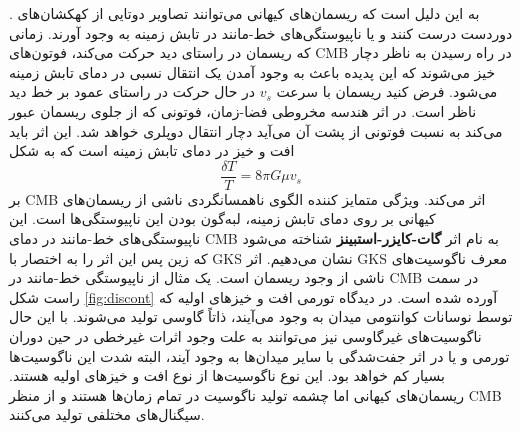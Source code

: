 . به این دلیل است که ریسمان‌های کیهانی می‌توانند تصاویر دوتایی از کهکشان‌های دوردست درست کنند و یا ناپیوستگی‌های خط-مانند در تابش زمینه به وجود آورند.
  \cite{ade2014planck}
   زمانی که ریسمان در راستای دید حرکت می‌کند، فوتون‌های CMB  در راه رسیدن به ناظر دچار خیز می‌شوند که این پدیده باعث به وجود آمدن یک انتقال نسبی در دمای تابش زمینه می‌شود. فرض کنید ریسمان با سرعت $v_s$ در حال حرکت در راستای عمود بر خط دید ناظر است. در اثر هندسه مخروطی فضا-زمان، فوتونی که از جلوی ریسمان عبور می‌کند به نسبت فوتونی از پشت آن می‌آید دچار انتقال دوپلری خواهد شد. این اثر باید افت و خیز در دمای تابش زمینه است که به شکل
    \begin{equation}
    \frac{\delta T}{T} = 8 \pi G \mu v_s 
    \end{equation}
    بر CMB اثر می‌کند.  ویژگی متمایز کننده‌ الگوی ناهمسانگردی ناشی از ریسمان‌های کیهانی بر روی دمای تابش زمینه، لبه‌گون بودن این ناپیوستگی‌ها است.
  \cite{kaiser1984microwave}
  این ناپیوستگی‌های خط-مانند در دمای CMB به نام اثر \textbf{گات-کایزر-استبینز }شناخته می‌شود که زین پس این اثر را به اختصار با GKS نشان می‌دهیم. اثر GKS معرف ناگوسیت‌های ناشی از وجود ریسمان است. 
  \cite{gott1985gravitational}
یک مثال از ناپیوستگی خط-مانند در CMB در سمت راست شکل 
\ref{fig:discont}
آورده شده است.
  در دیدگاه تورمی افت و خیزهای اولیه که توسط نوسانات کوانتومی میدان به وجود می‌آیند، ذاتاً گاوسی تولید می‌شوند. با این حال ناگوسیت‌های غیرگاوسی نیز می‌توانند به علت وجود اثرات غیرخطی در حین دوران تورمی و یا در اثر جفت‌شدگی با سایر میدان‌ها به وجود آیند، البته شدت این ناگوسیت‌ها بسیار کم خواهد بود.
  \cite{sefusatti2007bispectrum}
  این نوع ناگوسیت‌ها از نوع افت و خیزهای اولیه هستند. ریسمان‌های کیهانی اما چشمه تولید ناگوسیت در تمام زمان‌ها هستند و از منظر  CMB سیگنال‌های مختلفی تولید می‌کنند.    
  \cite{ringeval2010cosmic}
 
